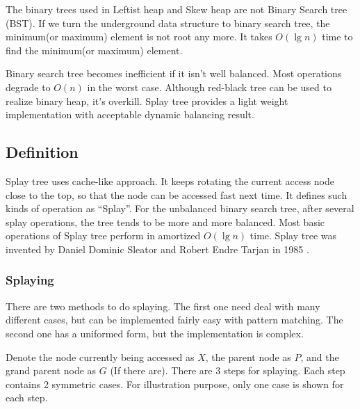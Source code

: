 \documentclass[b5paper]{article}
\begin{document}
The binary trees used in Leftist heap and Skew heap
are not Binary Search tree (BST). If we turn the underground
data structure to binary search tree, the minimum(or maximum)
element is not root any more. It takes $O(\lg n)$ time
to find the minimum(or maximum) element.

Binary search tree becomes inefficient if it isn't well
balanced. Most operations degrade to $O(n)$ in the worst case.
Although red-black tree can be used to realize
binary heap, it's overkill. Splay tree provides a light weight
implementation with acceptable dynamic balancing result.


\subsection{Definition}

Splay tree uses cache-like approach. It keeps rotating the current
access node close to the top, so that the node can be accessed fast
next time. It defines such kinds of operation as ``Splay''. For the
unbalanced binary search tree, after several splay operations, the
tree tends to be more and more balanced. Most basic operations of
Splay tree perform in amortized $O(\lg n)$ time. Splay tree was invented
by Daniel Dominic Sleator and Robert Endre Tarjan in 1985\cite{wiki-splay-tree}
\cite{self-adjusting-trees}.

\subsubsection{Splaying}

There are two methods to do splaying. The first one need deal
with many different cases, but can be implemented fairly easy with
pattern matching. The second one has a uniformed form, but the implementation
is complex.

Denote the node currently being accessed as $X$, the parent node as $P$,
and the grand parent node as $G$ (If there are).  There are 3 steps for
splaying. Each step contains 2 symmetric cases. For illustration
purpose, only one case is shown for each step.
\end{document}
